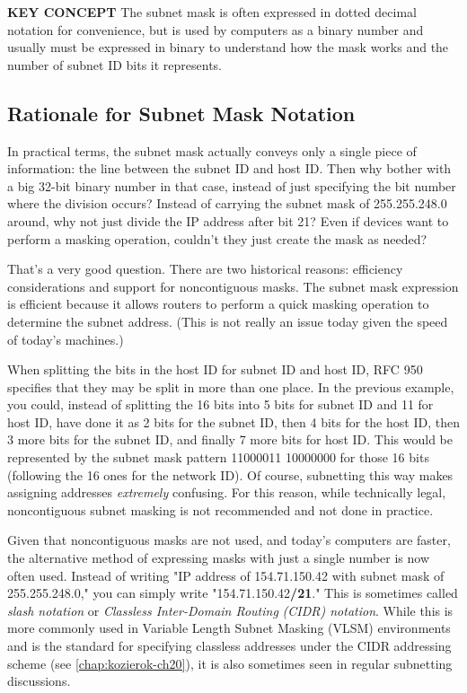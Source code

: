 \documentclass[b5paper,11pt]{memoir}
\begin{document}
{\textbf{KEY CONCEPT}} The subnet mask is often expressed in dotted
decimal notation for convenience, but is used by computers as a binary
number and usually must be expressed in binary to understand how the
mask works and the number of subnet ID bits it represents.



\subsection{Rationale for Subnet Mask Notation}

In practical terms, the subnet mask actually conveys only a single piece
of information: the line between the subnet ID and host ID. Then why
bother with a big 32-bit binary number in that case, instead of just
specifying the bit number where the division occurs? Instead of carrying
the subnet mask of 255.255.248.0 around, why not just divide the IP
address after bit 21? Even if devices want to perform a masking
operation, couldn't they just create the mask as needed?

That's a very good question. There are two historical reasons:
efficiency considerations and support for
\protect\hypertarget{ch18s03.htmlux5cux23idx-CHP-18-0727}{}{}noncontiguous
masks. The subnet mask expression is efficient because it allows routers
to perform a quick masking operation to determine the subnet address.
(This is not really an issue today given the speed of today's machines.)

When splitting the bits in the host ID for subnet ID and host ID, RFC
950 specifies that they may be split in more than one place. In the
previous example, you could, instead of splitting the 16 bits into 5
bits for subnet ID and 11 for host ID, have done it as 2 bits for the
subnet ID, then 4 bits for the host ID, then 3 more bits for the subnet
ID, and finally 7 more bits for host ID. This would be represented by
the subnet mask pattern 11000011 10000000 for those 16 bits (following
the 16 ones for the network ID). Of course, subnetting this way makes
assigning addresses {\emph{extremely}} confusing. For this reason, while
technically legal, noncontiguous subnet masking is not recommended and
not done in practice.

Given that noncontiguous masks are not used, and today's computers are
faster, the alternative method of expressing masks with just a single
number is now often used. Instead of writing
"\protect\hypertarget{ch18s03.htmlux5cux23idx-CHP-18-0728}{}{}IP address
of 154.71.150.42 with subnet mask of 255.255.248.0," you can simply
write "154.71.150.42{\textbf{/21}}." This is sometimes called
\protect\hypertarget{ch18s03.htmlux5cux23idx-CHP-18-0729}{}{}{\emph{slash
notation}} or
\protect\hypertarget{ch18s03.htmlux5cux23idx-CHP-18-0730}{}{}{\emph{Classless
Inter-Domain Routing}} {\emph{(CIDR) notation}}.
While this is more commonly used in Variable Length Subnet Masking (VLSM) environments and is the standard for specifying classless addresses under the CIDR addressing scheme (see \vref{chap:kozierok-ch20}), it is also sometimes seen in regular subnetting discussions.
\end{document}
